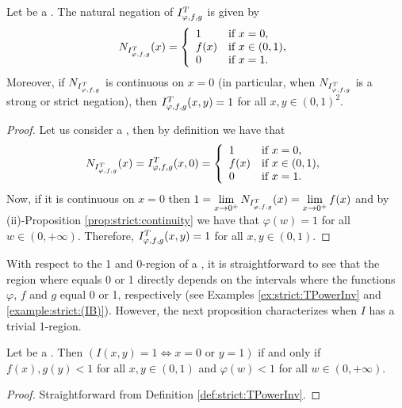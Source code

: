 \begin{corollary}\label{cor:strict:natural_negation} Let \IT be a \STP. The natural negation of $I^T_{\varphi,f,g}$ is given by
	$$ N_{I^T_{\varphi,f,g}}(x)=\left\{ \begin{array}{ll}
		1 &  \text{if }  x=0, \\
		f(x) & \text{if }  x \in(0,1),\\
		0 &  \text{if }x=1.
	\end{array}
	\right.
	$$
	Moreover, if $N_{I^T_{\varphi,f,g}}$ is continuous on $x=0$ (in particular, when $N_{I^T_{\varphi,f,g}}$ is a strong or strict negation), then $I^T_{\varphi,f,g}(x,y)=1$ for all $x,y \in (0,1)^2$.
\end{corollary}
\begin{proof} 
	Let us consider \IT a \STP, then by definition we have that
	$$
	N_{I^T_{\varphi,f,g}}(x)=I^T_{\varphi,f,g}(x,0)= \left\{ \begin{array}{ll}
		1 &  \text{if }  x=0, \\
		f(x) & \text{if }  x \in(0,1),\\
		0 &  \text{if }x=1.
	\end{array}
	\right.
	$$
	Now, if it is continuous on $x=0$ then $\displaystyle 1=\lim_{x \to 0^+} N_{I^T_{\varphi,f,g}}(x) = \lim_{x \to 0^+} f(x)$ and by {(ii)-Proposition \ref{prop:strict:continuity}} we have that $\varphi(w)=1$ for all $w \in (0,+\infty)$. Therefore, $I^T_{\varphi,f,g}(x,y)=1$ for all $x,y \in (0,1)$.
\end{proof}
With respect to the 1 and 0-region of a \STP, it is straightforward to see that the region where \IT equals 0 or 1 directly depends on the intervals where the functions $\varphi$, $f$ and $g$ equal 0 or 1, respectively (see Examples \ref{ex:strict:TPowerInv} and \ref{example:strict:(IB)}). However, the next proposition characterizes when $I$ has a trivial 1-region.

\begin{proposition}\label{prop:strict:1-region}
	 Let \IT be a \STP. Then $(I(x,y)=1 \Leftrightarrow x=0 \text{ or } y=1)$ if and only if $f(x),g(y)<1$ for all $x,y \in (0,1)$ and $\varphi(w)<1$ for all $w \in (0,+\infty)$.
\end{proposition} 
\begin{proof} Straightforward from Definition \ref{def:strict:TPowerInv}.
\end{proof}


